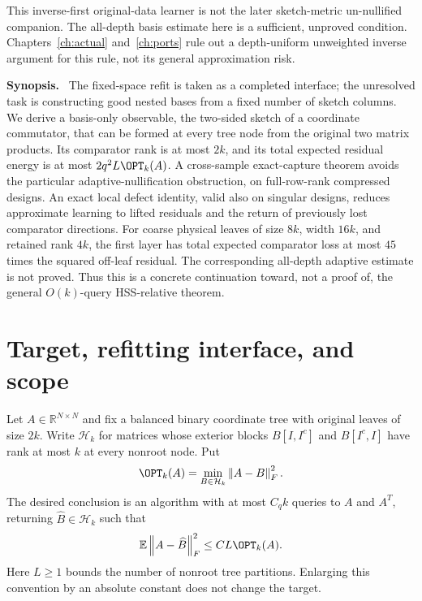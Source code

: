 \documentclass[11pt,oneside,openany,a4paper]{book}
\numberwithin{equation}{chapter}
\theoremstyle{definition}
\theoremstyle{remark}
\newenvironment{chaptersynopsis}{\begingroup\small\textbf{Synopsis.}\ }{\par\endgroup\medskip}
\newcommand{\R}{\mathbb R}\newcommand{\E}{\mathbb E}\newcommand{\Prb}{\mathbb P}\newcommand{\PP}{\mathbb P}
\newcommand{\F}[1]{\left\lVert#1\right\rVert_F}
\newcommand{\HH}{\mathcal H}\newcommand{\SSS}{\mathcal S}
\begin{document}
\begin{scopebox}
This inverse-first original-data learner is not the later sketch-metric un-nullified companion. The all-depth basis estimate here is a sufficient, unproved condition. Chapters~\ref{ch:actual} and~\ref{ch:ports} rule out a depth-uniform unweighted inverse argument for this rule, not its general approximation risk.
\end{scopebox}
\thispagestyle{plain}
\begin{chaptersynopsis}
The fixed-space refit is taken as a completed interface; the unresolved task is constructing good nested bases from a fixed number of sketch columns. We derive a basis-only observable, the two-sided sketch of a coordinate commutator, that can be formed at every tree node from the original two matrix products. Its comparator rank is at most $2k$, and its total expected residual energy is at most $2q^2 L\OPT_k(A)$. A cross-sample exact-capture theorem avoids the particular adaptive-nullification obstruction, on full-row-rank compressed designs. An exact local defect identity, valid also on singular designs, reduces approximate learning to lifted residuals and the return of previously lost comparator directions. For coarse physical leaves of size $8k$, width $16k$, and retained rank $4k$, the first layer has total expected comparator loss at most $45$ times the squared off-leaf residual. The corresponding all-depth adaptive estimate is not proved. Thus this is a concrete continuation toward, not a proof of, the general $O(k)$-query HSS-relative theorem.
\end{chaptersynopsis}


\section{Target, refitting interface, and scope}
Let $A\in\R^{N\times N}$ and fix a balanced binary coordinate tree with original leaves of size $2k$. Write $\HH_k$ for matrices whose exterior blocks $B[I,I^c]$ and $B[I^c,I]$ have rank at most $k$ at every nonroot node. Put
\[
 \OPT_k(A)=\min_{B\in\HH_k}\F{A-B}^2.
\]
The desired conclusion is an algorithm with at most $C_qk$ queries to $A$ and $A^T$, returning $\widehat B\in\HH_k$ such that
\begin{equation}\label{comm:eq:target}
 \E\F{A-\widehat B}^2\le C L\OPT_k(A).
\end{equation}
Here $L\ge1$ bounds the number of nonroot tree partitions. Enlarging this convention by an absolute constant does not change the target.
\end{document}
